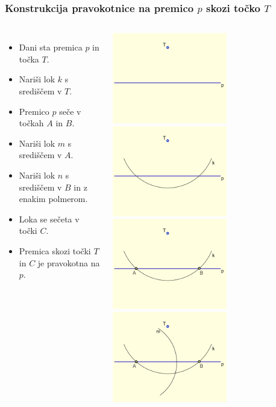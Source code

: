 \begin{frame}
	\frametitle{Konstrukcija pravokotnice na premico $p$ skozi točko $T$}	
	\begin{columns}
		  \begin{itemize}[<+->]
			 \item Dani sta premica $p$ in točka $T$.
			 \item Nariši lok $k$ s središčem v $T$.
			 \item Premico $p$ seče v točkah $A$ in $B$.
			 \item Nariši lok $m$ s središčem v $A$.
			 \item Nariši lok $n$ s središčem v $B$ in z enakim polmerom.
			 \item Loka se sečeta v točki $C$.
			 \item Premica skozi točki $T$ in $C$ je pravokotna na $p$.
		  \end{itemize}
\centering
		  {\includegraphics[width=50mm]{slike/fig-1.png}}
		 \only<2> {\includegraphics[width=50mm]{slike/fig-2.png}}
		 \only<3> {\includegraphics[width=50mm]{slike/fig-3.png}}
		 \only<4> {\includegraphics[width=50mm]{slike/fig-4.png}}

\end{columns}
\end{frame}
